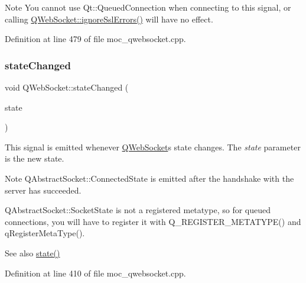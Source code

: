\begin{DoxyNote}{Note}
You cannot use Qt\+::\+Queued\+Connection when connecting to this signal, or calling \mbox{\hyperlink{class_q_web_socket_aed580d710b6613a6218a78f4c07fb856}{Q\+Web\+Socket\+::ignore\+Ssl\+Errors()}} will have no effect. 
\end{DoxyNote}


Definition at line 479 of file moc\+\_\+qwebsocket.\+cpp.

\mbox{\label{class_q_web_socket_aba46b4ae0292aee9632297a56122902a}} 
\subsubsection{\texorpdfstring{state\+Changed}{stateChanged}}
{\footnotesize\ttfamily void Q\+Web\+Socket\+::state\+Changed (\begin{DoxyParamCaption}\item[{Q\+Abstract\+Socket\+::\+Socket\+State}]{state }\end{DoxyParamCaption})\hspace{0.3cm}{\ttfamily [signal]}}

This signal is emitted whenever \mbox{\hyperlink{class_q_web_socket}{Q\+Web\+Socket}}\textquotesingle{}s state changes. The {\itshape state} parameter is the new state.

\begin{DoxyNote}{Note}
Q\+Abstract\+Socket\+::\+Connected\+State is emitted after the handshake with the server has succeeded.
\end{DoxyNote}
Q\+Abstract\+Socket\+::\+Socket\+State is not a registered metatype, so for queued connections, you will have to register it with Q\+\_\+\+R\+E\+G\+I\+S\+T\+E\+R\+\_\+\+M\+E\+T\+A\+T\+Y\+P\+E() and q\+Register\+Meta\+Type().

\begin{DoxySeeAlso}{See also}
\mbox{\hyperlink{class_q_web_socket_abf40a05dfbb85a86355c73f7c2f2c492}{state()}} 
\end{DoxySeeAlso}


Definition at line 410 of file moc\+\_\+qwebsocket.\+cpp.

\mbox{\label{class_q_web_socket_af0feabc8f7979f054b15d903a54882a6}} 

